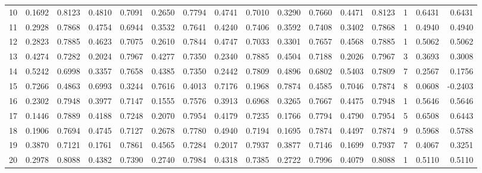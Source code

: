 \begin{tabular}{lrrrrrrrrrrrrrrr}
10  &      0.1692 &  0.8123 &  0.4810 &  0.7091 &  0.2650 &  0.7794 &  0.4741 &  0.7010 &  0.3290 &  0.7660 &   0.4471 &     0.8123 &      1 &                    0.6431 &                     0.6431 \\
11  &      0.2928 &  0.7868 &  0.4754 &  0.6944 &  0.3532 &  0.7641 &  0.4240 &  0.7406 &  0.3592 &  0.7408 &   0.3402 &     0.7868 &      1 &                    0.4940 &                     0.4940 \\
12  &      0.2823 &  0.7885 &  0.4623 &  0.7075 &  0.2610 &  0.7844 &  0.4747 &  0.7033 &  0.3301 &  0.7657 &   0.4568 &     0.7885 &      1 &                    0.5062 &                     0.5062 \\
13  &      0.4274 &  0.7282 &  0.2024 &  0.7967 &  0.4277 &  0.7350 &  0.2340 &  0.7885 &  0.4504 &  0.7188 &   0.2026 &     0.7967 &      3 &                    0.3693 &                     0.3008 \\
14  &      0.5242 &  0.6998 &  0.3357 &  0.7658 &  0.4385 &  0.7350 &  0.2442 &  0.7809 &  0.4896 &  0.6802 &   0.5403 &     0.7809 &      7 &                    0.2567 &                     0.1756 \\
15  &      0.7266 &  0.4863 &  0.6993 &  0.3244 &  0.7616 &  0.4013 &  0.7176 &  0.1968 &  0.7874 &  0.4585 &   0.7046 &     0.7874 &      8 &                    0.0608 &                    -0.2403 \\
16  &      0.2302 &  0.7948 &  0.3977 &  0.7147 &  0.1555 &  0.7576 &  0.3913 &  0.6968 &  0.3265 &  0.7667 &   0.4475 &     0.7948 &      1 &                    0.5646 &                     0.5646 \\
17  &      0.1446 &  0.7889 &  0.4188 &  0.7248 &  0.2070 &  0.7954 &  0.4179 &  0.7235 &  0.1766 &  0.7794 &   0.4790 &     0.7954 &      5 &                    0.6508 &                     0.6443 \\
18  &      0.1906 &  0.7694 &  0.4745 &  0.7127 &  0.2678 &  0.7780 &  0.4940 &  0.7194 &  0.1695 &  0.7874 &   0.4497 &     0.7874 &      9 &                    0.5968 &                     0.5788 \\
19  &      0.3870 &  0.7121 &  0.1761 &  0.7861 &  0.4565 &  0.7284 &  0.2017 &  0.7937 &  0.3877 &  0.7146 &   0.1699 &     0.7937 &      7 &                    0.4067 &                     0.3251 \\
20  &      0.2978 &  0.8088 &  0.4382 &  0.7390 &  0.2740 &  0.7984 &  0.4318 &  0.7385 &  0.2722 &  0.7996 &   0.4079 &     0.8088 &      1 &                    0.5110 &                     0.5110 \\

\end{tabular}
